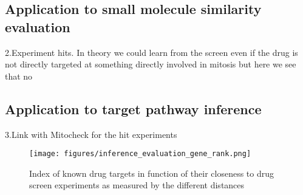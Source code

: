 

\subsection{Application to small molecule similarity evaluation}
2.Experiment hits. In theory we could learn from the screen even if the drug is not directly targeted at something directly involved in mitosis but here we see that no

\subsection{Application to target pathway inference}
3.Link with Mitocheck for the hit experiments


\begin{figure*}[ht!]
\centerline{\texttt{[image: figures/inference\_evaluation\_gene\_rank.png]}
}
\caption{Index of known drug targets in function of their closeness to drug screen experiments as measured by the different distances}
\label{gene_rank}
\end{figure*}




